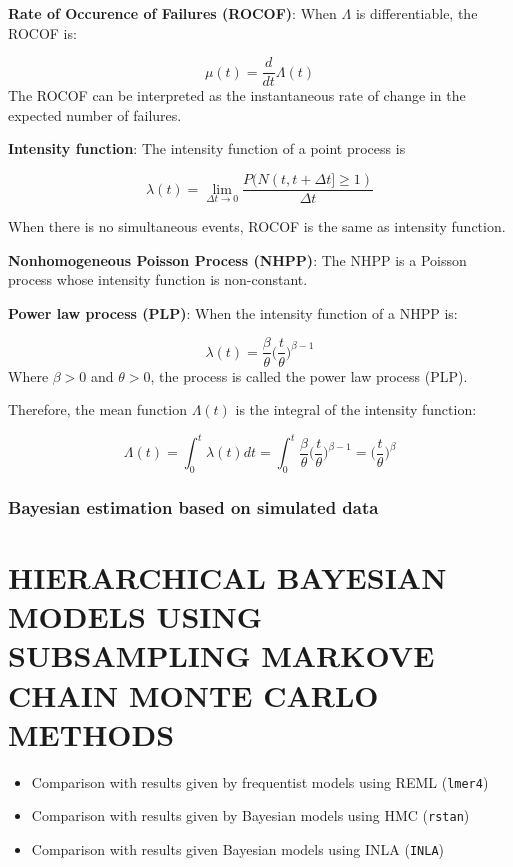 \documentclass[12pt]{book}
\numberwithin{equation}{chapter}
\providecommand{\tightlist}{%
  \setlength{\itemsep}{0pt}\setlength{\parskip}{0pt}}
\begin{document}
\textbf{Rate of Occurence of Failures (ROCOF)}: When \(\Lambda\) is differentiable, the ROCOF is:

\[\mu(t) = \frac{d}{dt}\Lambda(t)\]
The ROCOF can be interpreted as the instantaneous rate of change in the expected number of failures.

\textbf{Intensity function}: The intensity function of a point process is

\[\lambda(t) = \lim_{\Delta t \rightarrow 0}\frac{P(N(t, t+\Delta t] \geq 1)}{\Delta t}\]

When there is no simultaneous events, ROCOF is the same as intensity function.

\textbf{Nonhomogeneous Poisson Process (NHPP)}: The NHPP is a Poisson process whose intensity function is non-constant.

\textbf{Power law process (PLP)}: When the intensity function of a NHPP is:

\[\lambda(t) = \frac{\beta}{\theta}\bigg(\frac{t}{\theta}\bigg)^{\beta-1}\]
Where \(\beta > 0\) and \(\theta > 0\), the process is called the power law process (PLP).

Therefore, the mean function \(\Lambda(t)\) is the integral of the intensity function:

\[\Lambda(t) = \int_0^t \lambda(t)dt = \int_0^t \frac{\beta}{\theta}\bigg(\frac{t}{\theta}\bigg)^{\beta-1} = \bigg(\frac{t}{\theta}\bigg)^{\beta}\]

\hypertarget{section}{%
\subsection{}\label{section}}

\hypertarget{bayesian-estimation-based-on-simulated-data-1}{%
\subsection{Bayesian estimation based on simulated data}\label{bayesian-estimation-based-on-simulated-data-1}}

\hypertarget{hierarchical-bayesian-models-using-subsampling-markove-chain-monte-carlo-methods}{%
\chapter{HIERARCHICAL BAYESIAN MODELS USING SUBSAMPLING MARKOVE CHAIN MONTE CARLO METHODS}\label{hierarchical-bayesian-models-using-subsampling-markove-chain-monte-carlo-methods}}

\begin{itemize}
\tightlist
\item
  Comparison with results given by frequentist models using REML (\texttt{lmer4})
\item
  Comparison with results given by Bayesian models using HMC (\texttt{rstan})
\item
  Comparison with results given Bayesian models using INLA (\texttt{INLA})
\end{itemize}
\end{document}
